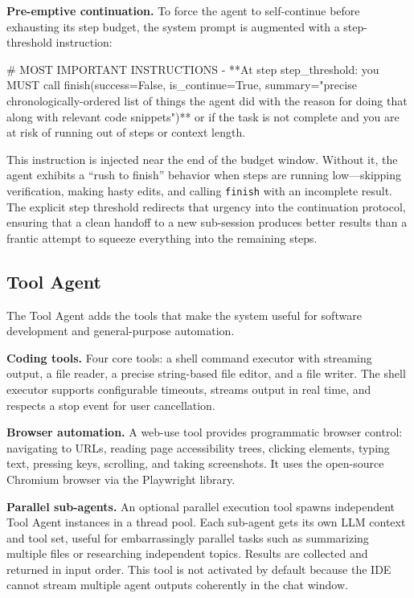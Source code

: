 \documentclass{article}
\begin{document}
\textbf{Pre-emptive continuation.}  To force the agent to self-continue before exhausting its step budget, the system prompt is augmented with a step-threshold instruction:

\begin{prompt}
# MOST IMPORTANT INSTRUCTIONS
- **At step {step_threshold}: you MUST call
  finish(success=False, is_continue=True,
  summary="precise chronologically-ordered list of things
  the agent did with the reason for doing that along with
  relevant code snippets")** or if the task is not complete
  and you are at risk of running out of steps or context
  length.
\end{prompt}

\noindent This instruction is injected near the end of the budget window.  Without it, the agent exhibits a ``rush to finish'' behavior when steps are running low---skipping verification, making hasty edits, and calling \texttt{finish} with an incomplete result.  The explicit step threshold redirects that urgency into the continuation protocol, ensuring that a clean handoff to a new sub-session produces better results than a frantic attempt to squeeze everything into the remaining steps.

\subsection{Tool Agent}
\label{sec:tool-agent}

The Tool Agent adds the tools that make the system useful for software development and general-purpose automation.

\textbf{Coding tools.}  Four core tools: a shell command executor with streaming output, a file reader, a precise string-based file editor, and a file writer.  The shell executor supports configurable timeouts, streams output in real time, and respects a stop event for user cancellation.

\textbf{Browser automation.}  A web-use tool provides programmatic browser control: navigating to URLs, reading page accessibility trees, clicking elements, typing text, pressing keys, scrolling, and taking screenshots.  It uses the open-source Chromium browser via the Playwright library.

\textbf{Parallel sub-agents.}  An optional parallel execution tool spawns independent Tool Agent instances in a thread pool.  Each sub-agent gets its own LLM context and tool set, useful for embarrassingly parallel tasks such as summarizing multiple files or researching independent topics.  Results are collected and returned in input order.  This tool is not activated by default because the IDE cannot stream multiple agent outputs coherently in the chat window.
\end{document}
